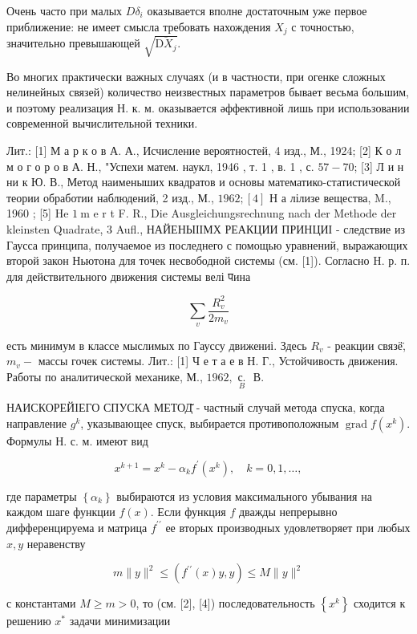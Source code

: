 \documentclass[10pt]{article}
\begin{document}
Очень часто при малых $D \delta_{i}$ оказывается вполне достаточным уже первое приближение: не имеет смысла требовать нахождения $X_{j}$ с точностью, значительно превышающей $\sqrt{\overline{\mathrm{D} X_{j}}}$.



Во многих практически важных случаях (и в частности, при огенке сложных нелинейных связей) количество неизвестных параметров бывает весьма большим, и поэтому реализация Н. к. м. оказывается әффективной лишь при использовании современной вычислительной техники.



Лит.: [1] М а р к о в А. А., Исчисление вероятностей, 4 изд., М., 1924; [2] К о л м о г о р о в А. Н., "Успехи матем. наукл, 1946 , т. 1 , в. 1 , с. $57-70$; [3] Л и н ни к Ю. В., Метод наименыших квадратов и основы математико-статистической теории обработии наблюдений, 2 изд., М., $1962 ;[4]$ Н а лілизе вещества, M., 1960 ; [5] He $1 \mathrm{~m}$ e r t F. R., Die Ausgleichungsrechnung nach der Methode der kleinsten Quadrate, 3 Aufl., НАЙЕНЫІІМХ РЕАКЦИИ ПРИНЦИІ - следствие из Гаусса принципа, получаемое из последнего с помощью уравнений, выражающих второй закон Ньютона для точек несвободной системы (см. [1]). Согласно H. р. п. для действительного движения системы велі पина



\[

\sum_{v} \frac{R_{v}^{2}}{2 m_{v}}

\]



есть минимум в классе мыслимых по Гауссу движениі. Здесь $R_{v}$ - реакции связё̈, $m_{v}-$ массы гочек системы. Лит.: [1] Ч е т а е в Н. Г., Устойчивость движения. Работы по аналитической механике, М., $1962, \underset{B}{\text { с. }}$ В.



НАИСКОРЕЙІЕГО СПУСКА МЕТОД̆ - частный случай метода спуска, когда направление $g^{k}$, указывающее спуск, выбирается противоположным $\operatorname{grad} f\left(x^{k}\right)$. Формулы Н. с. м. имеют вид



\[

x^{k+1}=x^{k}-\alpha_{k} f^{\prime}\left(x^{k}\right), \quad k=0,1, \ldots,

\]



где параметры $\left\{\alpha_{k}\right\}$ выбираются из условия максимального убывания на каждом шаге функции $f(x)$. Если функция $f$ дважды непрерывно дифференцируема и матрица $f^{\prime \prime}$ ее вторых производных удовлетворяет при любых $x, y$ неравенству



\[

m\|y\|^{2} \leqslant\left(f^{\prime \prime}(x) y, y\right) \leqslant M\|y\|^{2}

\]



с константами $M \geqslant m>0$, то (см. [2], [4]) последовательность $\left\{x^{k}\right\}$ сходится к решению $x^{*}$ задачи минимизации
\end{document}
